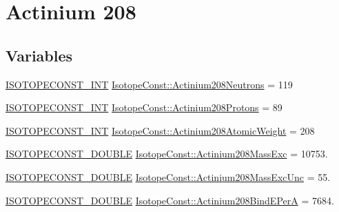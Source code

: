 \hypertarget{group___isotope_const-_actinium-_ac208}{}\section{Actinium 208}
\label{group___isotope_const-_actinium-_ac208}
\subsection*{Variables}
\begin{DoxyCompactItemize}
\item 
\mbox{\hyperlink{group___isotope_const-_macros_ga5f18360b3e99483a35c32d789e62621c}{I\+S\+O\+T\+O\+P\+E\+C\+O\+N\+S\+T\+\_\+\+I\+NT}} \mbox{\hyperlink{group___isotope_const-_actinium-_ac208_ga36ac7574eb1ea1a1eac5da5240419293}{Isotope\+Const\+::\+Actinium208\+Neutrons}} = 119
\item 
\mbox{\hyperlink{group___isotope_const-_macros_ga5f18360b3e99483a35c32d789e62621c}{I\+S\+O\+T\+O\+P\+E\+C\+O\+N\+S\+T\+\_\+\+I\+NT}} \mbox{\hyperlink{group___isotope_const-_actinium-_ac208_ga93070fef125ff2de65076f0c1f61aca2}{Isotope\+Const\+::\+Actinium208\+Protons}} = 89
\item 
\mbox{\hyperlink{group___isotope_const-_macros_ga5f18360b3e99483a35c32d789e62621c}{I\+S\+O\+T\+O\+P\+E\+C\+O\+N\+S\+T\+\_\+\+I\+NT}} \mbox{\hyperlink{group___isotope_const-_actinium-_ac208_ga0d0db164b2cf2b80c0f5697e4f9180ae}{Isotope\+Const\+::\+Actinium208\+Atomic\+Weight}} = 208
\item 
\mbox{\hyperlink{group___isotope_const-_macros_ga8f45a7272ce02c0b4c65c44636ed719a}{I\+S\+O\+T\+O\+P\+E\+C\+O\+N\+S\+T\+\_\+\+D\+O\+U\+B\+LE}} \mbox{\hyperlink{group___isotope_const-_actinium-_ac208_ga9c46e463ec2c504fb6235562fb959ed7}{Isotope\+Const\+::\+Actinium208\+Mass\+Exc}} = 10753.
\item 
\mbox{\hyperlink{group___isotope_const-_macros_ga8f45a7272ce02c0b4c65c44636ed719a}{I\+S\+O\+T\+O\+P\+E\+C\+O\+N\+S\+T\+\_\+\+D\+O\+U\+B\+LE}} \mbox{\hyperlink{group___isotope_const-_actinium-_ac208_ga91413e6b0e483e661a2bcef05205de78}{Isotope\+Const\+::\+Actinium208\+Mass\+Exc\+Unc}} = 55.
\item 
\mbox{\hyperlink{group___isotope_const-_macros_ga8f45a7272ce02c0b4c65c44636ed719a}{I\+S\+O\+T\+O\+P\+E\+C\+O\+N\+S\+T\+\_\+\+D\+O\+U\+B\+LE}} \mbox{\hyperlink{group___isotope_const-_actinium-_ac208_ga90c75cd6946ebec2a1bf73c4c44552f4}{Isotope\+Const\+::\+Actinium208\+Bind\+E\+PerA}} = 7684.
\item 

\end{DoxyCompactItemize}
